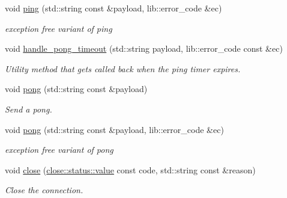\begin{DoxyCompactItemize}
\mbox{\label{classwebsocketpp_1_1connection_a6766e2f31adc6843a983551b21683b73}} 
void \mbox{\hyperlink{classwebsocketpp_1_1connection_a6766e2f31adc6843a983551b21683b73}{ping}} (std\+::string const \&payload, lib\+::error\+\_\+code \&ec)
\begin{DoxyCompactList}\small\item\em exception free variant of ping \end{DoxyCompactList}\item 
\mbox{\label{classwebsocketpp_1_1connection_af10cbbbfe16ef1cc6f45614582c9d28f}} 
void \mbox{\hyperlink{classwebsocketpp_1_1connection_af10cbbbfe16ef1cc6f45614582c9d28f}{handle\+\_\+pong\+\_\+timeout}} (std\+::string payload, lib\+::error\+\_\+code const \&ec)
\begin{DoxyCompactList}\small\item\em Utility method that gets called back when the ping timer expires. \end{DoxyCompactList}\item 
void \mbox{\hyperlink{classwebsocketpp_1_1connection_aa8684fcfd9a57466ae1b52e36b834408}{pong}} (std\+::string const \&payload)
\begin{DoxyCompactList}\small\item\em Send a pong. \end{DoxyCompactList}\item 
\mbox{\label{classwebsocketpp_1_1connection_a837dcb8f1214f08b92e7ae7489bfa180}} 
void \mbox{\hyperlink{classwebsocketpp_1_1connection_a837dcb8f1214f08b92e7ae7489bfa180}{pong}} (std\+::string const \&payload, lib\+::error\+\_\+code \&ec)
\begin{DoxyCompactList}\small\item\em exception free variant of pong \end{DoxyCompactList}\item 
void \mbox{\hyperlink{classwebsocketpp_1_1connection_ae718e4fa8b2c37757d8abd71dae07dc9}{close}} (\mbox{\hyperlink{namespacewebsocketpp_1_1close_1_1status_a8614a5c4733d708e2d2a32191c5bef84}{close\+::status\+::value}} const code, std\+::string const \&reason)
\begin{DoxyCompactList}\small\item\em Close the connection. \end{DoxyCompactList}\item 

\end{DoxyCompactItemize}
